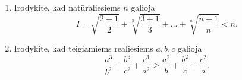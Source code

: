 \begin{enumerate}
  \item Įrodykite, kad natūraliesiems $n$ galioja
    $$I=\sqrt{\frac{2+1}{2}}+\sqrt[3]{\frac{3+1}{3}}+...+\sqrt[n]{\frac{n+1}{n}}<n.$$
  \item Įrodykite, kad teigiamiems realiesiems $a,b,c$ galioja
    $$\frac{a^3}{b^2}+\frac{b^3}{c^2}+\frac{c^3}{a^2}\geq
    \frac{a^2}{b}+\frac{b^2}{c}+\frac{c^2}{a}.$$

\end{enumerate}
